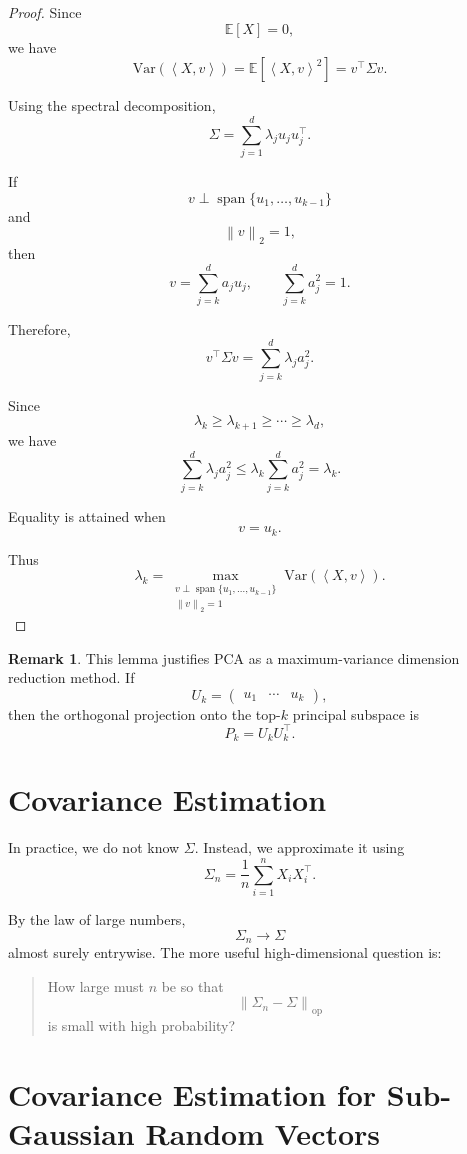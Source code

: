 \documentclass[12pt,oneside]{book}
\numberwithin{equation}{section}
\theoremstyle{definition}
\newtheorem{remark}{Remark}[section]
\theoremstyle{plain}
\theoremstyle{remark}
\newcommand{\E}{\mathbb{E}}
\newcommand{\Var}{\mathrm{Var}}
\newcommand{\norm}[1]{\left\lVert #1 \right\rVert}
\newcommand{\inner}[2]{\left\langle #1, #2 \right\rangle}
\begin{document}
\begin{proof}
Since
\[
\E[X]=0,
\]
we have
\[
\Var(\inner{X}{v})
=
\E[\inner{X}{v}^2]
=
v^\top \Sigma v.
\]

Using the spectral decomposition,
\[
\Sigma
=
\sum_{j=1}^d \lambda_j u_ju_j^\top.
\]

If
\[
v\perp \operatorname{span}\{u_1,\dots,u_{k-1}\}
\]
and
\[
\norm{v}_2=1,
\]
then
\[
v=\sum_{j=k}^d a_j u_j,
\qquad
\sum_{j=k}^d a_j^2=1.
\]

Therefore,
\[
v^\top\Sigma v
=
\sum_{j=k}^d \lambda_j a_j^2.
\]

Since
\[
\lambda_k\geq \lambda_{k+1}\geq \cdots \geq \lambda_d,
\]
we have
\[
\sum_{j=k}^d \lambda_j a_j^2
\leq
\lambda_k
\sum_{j=k}^d a_j^2
=
\lambda_k.
\]

Equality is attained when
\[
v=u_k.
\]

Thus
\[
\lambda_k
=
\max_{\substack{
v\perp \operatorname{span}\{u_1,\dots,u_{k-1}\}\\
\norm{v}_2=1
}}
\Var(\inner{X}{v}).
\]
\end{proof}

\begin{remark}
This lemma justifies PCA as a maximum-variance dimension reduction method. If
\[
U_k=
\begin{pmatrix}
u_1 & \cdots & u_k
\end{pmatrix},
\]
then the orthogonal projection onto the top-$k$ principal subspace is
\[
P_k=U_kU_k^\top.
\]
\end{remark}

\section{Covariance Estimation}

In practice, we do not know $\Sigma$. Instead, we approximate it using
\[
\Sigma_n
=
\frac{1}{n}
\sum_{i=1}^n X_iX_i^\top.
\]

By the law of large numbers,
\[
\Sigma_n\to \Sigma
\]
almost surely entrywise. The more useful high-dimensional question is:

\begin{quote}
How large must $n$ be so that
\[
\norm{\Sigma_n-\Sigma}_{\mathrm{op}}
\]
is small with high probability?
\end{quote}

\section{Covariance Estimation for Sub-Gaussian Random Vectors}
\end{document}
